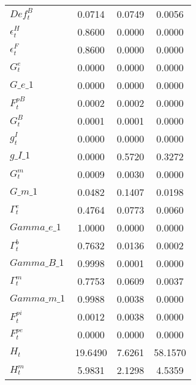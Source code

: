 \begin{center}
\begin{longtable}{lccc}
$ Def^B_t                   $	 & 	       0.0714	 & 	       0.0749	 & 	       0.0056 \\ 
$ \epsilon^H_t              $	 & 	       0.8600	 & 	       0.0000	 & 	       0.0000 \\ 
$ \epsilon^F_t              $	 & 	       0.8600	 & 	       0.0000	 & 	       0.0000 \\ 
$ G^e_t                     $	 & 	       0.0000	 & 	       0.0000	 & 	       0.0000 \\ 
$G\_e\_1                    $	 & 	       0.0000	 & 	       0.0000	 & 	       0.0000 \\ 
$ F^{pB}_t                  $	 & 	       0.0002	 & 	       0.0002	 & 	       0.0000 \\ 
$ G^B_t                     $	 & 	       0.0001	 & 	       0.0001	 & 	       0.0000 \\ 
$ g^I_t                     $	 & 	       0.0000	 & 	       0.0000	 & 	       0.0000 \\ 
$g\_I\_1                    $	 & 	       0.0000	 & 	       0.5720	 & 	       0.3272 \\ 
$ G^m_t                     $	 & 	       0.0009	 & 	       0.0030	 & 	       0.0000 \\ 
$G\_m\_1                    $	 & 	       0.0482	 & 	       0.1407	 & 	       0.0198 \\ 
$ \Gamma^e_t                $	 & 	       0.4764	 & 	       0.0773	 & 	       0.0060 \\ 
$Gamma\_e\_1                $	 & 	       1.0000	 & 	       0.0000	 & 	       0.0000 \\ 
$ \Gamma^b_t                $	 & 	       0.7632	 & 	       0.0136	 & 	       0.0002 \\ 
$Gamma\_B\_1                $	 & 	       0.9998	 & 	       0.0001	 & 	       0.0000 \\ 
$ \Gamma^m_t                $	 & 	       0.7753	 & 	       0.0609	 & 	       0.0037 \\ 
$Gamma\_m\_1                $	 & 	       0.9988	 & 	       0.0038	 & 	       0.0000 \\ 
$ F^{pi}_t                  $	 & 	       0.0012	 & 	       0.0038	 & 	       0.0000 \\ 
$ F^{pe}_t                  $	 & 	       0.0000	 & 	       0.0000	 & 	       0.0000 \\ 
$ H_t                       $	 & 	      19.6490	 & 	       7.6261	 & 	      58.1570 \\ 
$ H^m_t                     $	 & 	       5.9831	 & 	       2.1298	 & 	       4.5359 \\ 

\end{longtable}
\end{center}

